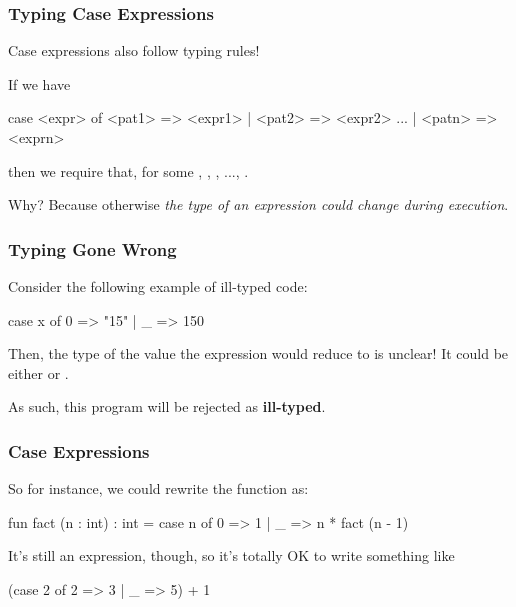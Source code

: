 \documentclass[aspectratio=169]{beamer}
\begin{document}
\begin{frame}[fragile]
  \frametitle{Typing Case Expressions}

  Case expressions also follow typing rules!

  \vspace{\fill}

  If we have
  \begin{codeblock}
    case <expr> of
      <pat1> => <expr1>
    | <pat2> => <expr2>
    ...
    | <patn> => <exprn> 
  \end{codeblock}
  then we require that, for some , , , ..., . 

  \vspace{\fill}

  Why? Because otherwise \textit{the type of an expression could change during execution}.
\end{frame}

\begin{frame}[fragile]
  \frametitle{Typing Gone Wrong}

  Consider the following example of ill-typed code:

  \begin{codeblock}
    case x of
      0 => "15" 
    | _ => 150 
  \end{codeblock}

  \vspace{\fill}

  Then, the type of the value the expression would reduce to is unclear! It could
  be either  or .   

  \vspace{\fill}

  As such, this program will be rejected as \textbf{ill-typed}.
\end{frame}

\begin{frame}[fragile]
  \frametitle{Case Expressions}
  So for instance, we could rewrite the  function as:

  \begin{codeblock}
    fun fact (n : int) : int = 
      case n of
        0 => 1
      | _ => n * fact (n - 1)
  \end{codeblock}

  \vspace{\fill}


  \vspace{\fill}

  It's still an expression, though, so it's totally OK to write something like
  \begin{codeblock}
    (case 2 of
      2 => 3
    | _ => 5) + 1 
  \end{codeblock}
\end{frame}
\end{document}
